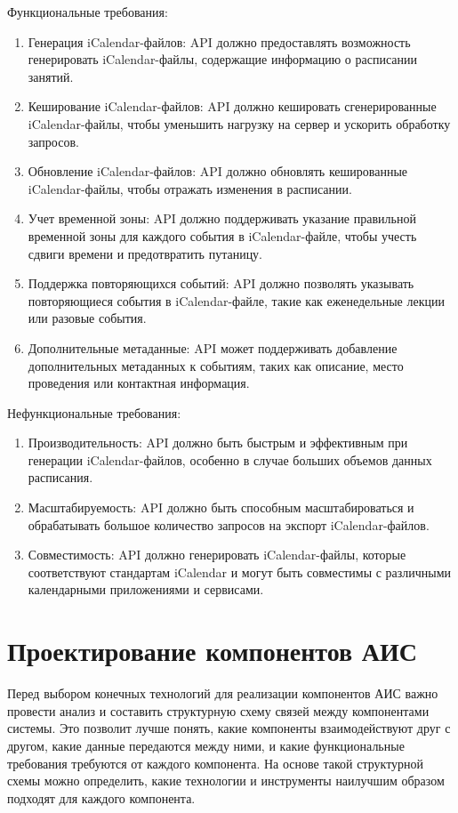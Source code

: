Функциональные требования:
\begin{enumerate}
  \item Генерация iCalendar-файлов: API должно предоставлять возможность генерировать iCalendar-файлы,
  содержащие информацию о расписании занятий.
  \item Кеширование iCalendar-файлов: API должно кешировать сгенерированные iCalendar-файлы,
  чтобы уменьшить нагрузку на сервер и ускорить обработку запросов.
  \item Обновление iCalendar-файлов: API должно обновлять кешированные iCalendar-файлы,
  чтобы отражать изменения в расписании.
  \item Учет временной зоны: API должно поддерживать указание правильной временной зоны
  для каждого события в iCalendar-файле, чтобы учесть сдвиги времени и предотвратить путаницу.
  \item Поддержка повторяющихся событий: API должно позволять указывать повторяющиеся события в
  iCalendar-файле, такие как еженедельные лекции или разовые события.
  \item Дополнительные метаданные: API может поддерживать добавление дополнительных
  метаданных к событиям, таких как описание, место проведения или контактная информация.
\end{enumerate}

Нефункциональные требования:
\begin{enumerate}
  \item Производительность: API должно быть быстрым и эффективным при генерации iCalendar-файлов,
  особенно в случае больших объемов данных расписания.
  \item Масштабируемость: API должно быть способным масштабироваться и
  обрабатывать большое количество запросов на экспорт iCalendar-файлов.
  \item Совместимость: API должно генерировать iCalendar-файлы,
  которые соответствуют стандартам iCalendar и могут быть совместимы
  с различными календарными приложениями и сервисами.
\end{enumerate}


\section{Проектирование компонентов АИС}
Перед выбором конечных технологий для реализации компонентов АИС важно провести анализ
и составить структурную схему связей между компонентами системы.
Это позволит лучше понять, какие компоненты взаимодействуют друг с другом,
какие данные передаются между ними, и какие функциональные требования требуются от каждого компонента.
На основе такой структурной схемы можно определить,
какие технологии и инструменты наилучшим образом подходят для каждого компонента.

